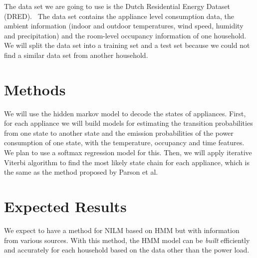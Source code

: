 \documentclass[11pt, letterpaper, headings=standardclasses]{scrartcl}
\begin{document}
The data set we are going to use is the Dutch Residential Energy
Dataset (DRED).~\cite{uttama2015loced} The data set contains the
appliance level consumption data, the ambient information (indoor and
outdoor temperatures, wind speed, humidity and precipitation) and the
room-level occupancy information of one household. We will split the
data set into a training set and a test set because we could not find
a similar data set from another household.

\section{Methods}

We will use the hidden markov model to decode the states of
appliances. First, for each appliance we will build models for
estimating the transition probabilities from one state to another
state and the emission probabilities of the power consumption of one
state, with the temperature, occupancy and time features. We plan to
use a softmax regression model for this. Then, we will apply iterative
Viterbi algorithm to find the most likely state chain for each
appliance, which is the same as the method proposed by Parson et
al.~\cite{parson2012non}

\section{Expected Results}

We expect to have a method for NILM based on HMM but with information
from various sources. With this method, the HMM model can be
\emph{built} efficiently and accurately for each household based on
the data other than the power load.

\nocite{*}


\end{document}
